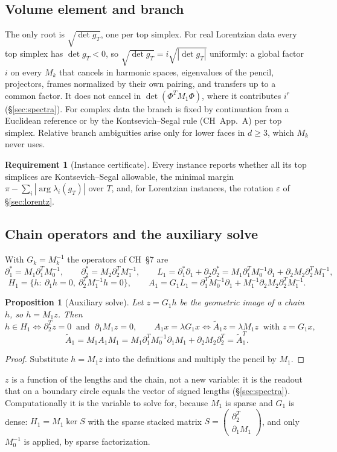 \documentclass[11pt]{article}
\theoremstyle{definition}
\newtheorem{requirement}{Requirement}[section]
\theoremstyle{plain}
\newtheorem{proposition}{Proposition}[section]
\theoremstyle{remark}
\newcommand{\Gram}{g}
\newcommand{\bd}{\partial}
\newcommand{\Tr}{^{T}}
\newcommand{\At}{\widetilde{A}}
\begin{document}
\subsection{Volume element and branch}\label{sec:branch}
The only root is \(\sqrt{\det\Gram_T}\), one per top simplex. For real Lorentzian data every top simplex has \(\det\Gram_T<0\), so \(\sqrt{\det\Gram_T}=i\sqrt{|\det\Gram_T|}\) uniformly: a global factor \(i\) on every \(M_k\) that cancels in harmonic spaces, eigenvalues of the pencil, projectors, frames normalized by their own pairing, and transfers up to a common factor. It does not cancel in \(\det(\Phi\Tr M_1\Phi)\), where it contributes \(i^{r}\) (\S\ref{sec:spectra}). For complex data the branch is fixed by continuation from a Euclidean reference or by the Kontsevich--Segal rule (CH~App.~A) per top simplex. Relative branch ambiguities arise only for lower faces in \(d\ge3\), which \(M_k\) never uses.

\begin{requirement}[Instance certificate]
Every instance reports whether all its top simplices are Kontsevich--Segal allowable, the minimal margin \(\pi-\sum_i|\arg\lambda_i(\Gram_T)|\) over \(T\), and, for Lorentzian instances, the rotation \(\varepsilon\) of \S\ref{sec:lorentz}.
\end{requirement}

\subsection{Chain operators and the auxiliary solve}\label{sec:aux}
With \(G_k=M_k^{-1}\) the operators of CH~\S7 are
\[
\bd_1^{*}=M_1\bd_1\Tr M_0^{-1},\qquad \bd_2^{*}=M_2\bd_2\Tr M_1^{-1},\qquad
L_1=\bd_1^{*}\bd_1+\bd_2\bd_2^{*}=M_1\bd_1\Tr M_0^{-1}\bd_1+\bd_2M_2\bd_2\Tr M_1^{-1},
\]
\[
H_1=\{h:\ \bd_1h=0,\ \bd_2\Tr M_1^{-1}h=0\},\qquad A_1=G_1L_1=\bd_1\Tr M_0^{-1}\bd_1+M_1^{-1}\bd_2M_2\bd_2\Tr M_1^{-1}.
\]

\begin{proposition}[Auxiliary solve]\label{prop:aux}
Let \(z=G_1h\) be the geometric image of a chain \(h\), so \(h=M_1z\). Then
\[
h\in H_1\iff \bd_2\Tr z=0\ \text{ and }\ \bd_1M_1z=0,\qquad
A_1x=\lambda G_1x\iff \At_1z=\lambda M_1z\ \text{ with } z=G_1x,
\]
\[
\At_1=M_1A_1M_1=M_1\bd_1\Tr M_0^{-1}\bd_1M_1+\bd_2M_2\bd_2\Tr=\At_1\Tr .
\]
\end{proposition}
\begin{proof}
Substitute \(h=M_1z\) into the definitions and multiply the pencil by \(M_1\).
\end{proof}
\(z\) is a function of the lengths and the chain, not a new variable: it is the readout that on a boundary circle equals the vector of signed lengths (\S\ref{sec:spectra}). Computationally it is the variable to solve for, because \(M_1\) is sparse and \(G_1\) is dense: \(H_1=M_1\ker S\) with the sparse stacked matrix \(S=\begin{pmatrix}\bd_2\Tr\\ \bd_1M_1\end{pmatrix}\), and only \(M_0^{-1}\) is applied, by sparse factorization.
\end{document}
